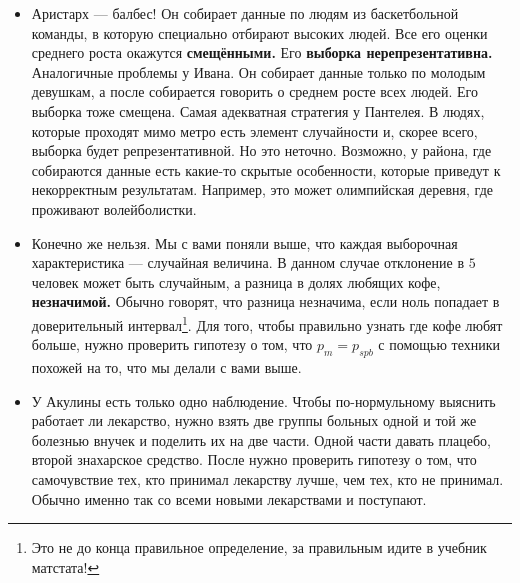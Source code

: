 \documentclass[12pt, a4paper, oneside]{article}
\theoremstyle{plain} %
\theoremstyle{definition}
\newcommand{\indef}[1]{\textbf{ \color{green} #1}}
\begin{document}

\begin{solution}
\begin{itemize}
	\item  Аристарх --- балбес! Он собирает данные по людям из баскетбольной команды, в которую специально отбирают высоких людей. Все его оценки среднего роста окажутся \indef{смещёнными.} Его \indef{выборка нерепрезентативна.}  Аналогичные проблемы у Ивана. Он собирает данные только по молодым девушкам, а после собирается говорить о среднем росте всех людей. Его выборка тоже смещена. Самая адекватная стратегия у Пантелея. В людях, которые проходят мимо метро есть элемент случайности и, скорее всего, выборка будет репрезентативной. Но это неточно. Возможно, у района, где собираются данные есть какие-то скрытые особенности, которые приведут к некорректным результатам. Например, это может олимпийская деревня, где проживают волейболистки.
	
	\item Конечно же нельзя. Мы с вами поняли выше, что каждая выборочная характеристика --- случайная величина. В данном случае отклонение в $5$ человек может быть случайным, а разница в долях любящих кофе, \indef{незначимой.} Обычно говорят, что разница незначима, если ноль попадает в доверительный интервал\footnote{Это не до конца правильное определение, за правильным идите в учебник матстата!}. Для того, чтобы правильно узнать где кофе любят больше, нужно проверить гипотезу о том, что $p_{m} = p_{spb}$ с помощью техники похожей на то, что мы делали с вами выше. 
	
	\item У Акулины есть только одно наблюдение. Чтобы по-нормульному выяснить работает ли лекарство, нужно взять две группы больных одной и той же болезнью внучек и поделить их на две части. Одной части давать плацебо, второй знахарское средство. После нужно проверить гипотезу о том, что самочувствие тех, кто принимал лекарству лучше, чем тех, кто не принимал. Обычно именно так со всеми новыми лекарствами и поступают.
\end{itemize}
\end{solution}
\end{document}

